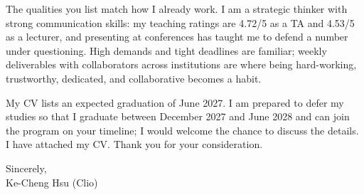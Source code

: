 \documentclass[11pt,letterpaper]{article}
\begin{document}
The qualities you list match how I already work. I am a strategic thinker with strong communication skills: my teaching ratings are 4.72/5 as a TA and 4.53/5 as a lecturer, and presenting at conferences has taught me to defend a number under questioning. High demands and tight deadlines are familiar; weekly deliverables with collaborators across institutions are where being hard-working, trustworthy, dedicated, and collaborative becomes a habit.

My CV lists an expected graduation of June 2027. I am prepared to defer my studies so that I graduate between December 2027 and June 2028 and can join the program on your timeline; I would welcome the chance to discuss the details. I have attached my CV. Thank you for your consideration.

\vspace{0.4em}
Sincerely,\\[0.8em]
Ke-Cheng Hsu (Clio)
\end{document}
